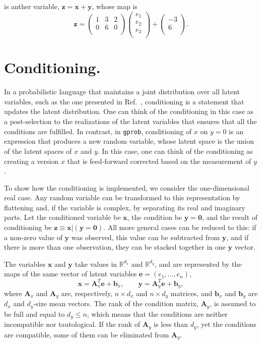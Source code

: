 \documentclass[a4paper,notitlepage]{article}
\renewcommand{\b}[1]{\mathbf{#1}}
\begin{document}
is anther variable, $\b{z}=\b{x}+\b{y}$, whose map is
\begin{equation}
\b{z}=
\begin{pmatrix}
1 & 3 & 2\\
0 & 6 & 0\\
\end{pmatrix}
\begin{pmatrix}
e_1\\
e_2\\
e_3\\
\end{pmatrix}
+
\begin{pmatrix}
-3\\
6\\
\end{pmatrix}.
\end{equation}


\section{Conditioning.}
\label{sec:conditioning}

In a probabilistic language that maintains a joint distribution over all latent variables, such as the one presented in Ref.~\cite{stein_compositional_2021}, conditioning is a statement that updates the latent distribution. One can think of the conditioning in this case as a post-selection to the realizations of the latent variables that ensures that all the conditions are fulfilled. In contrast, in \texttt{gprob}, conditioning of $x$ on $y=0$ is an expression that produces a new random variable, whose latent space is the union of the latent spaces of $x$ and $y$. 
In this case, one can think of the conditioning as creating a version $x$ that is feed-forward corrected based on the measurement of $y$.


To show how the conditioning is implemented, we consider the one-dimensional real case. Any random variable can be transformed to this representation by flattening and, if the variable is complex, by separating its real and imaginary parts. Let the conditioned variable be $\b{x}$, the condition be $\b{y}=\b{0}$, and the result of conditioning be $\b{z}\equiv\b{x}|(\b{y}=\b{0})$. All more general cases can be reduced to this: if a non-zero value of $\b{y}$ was observed, this value can be subtracted from $\b{y}$, and if there is more than one observation, they can be stacked together in one $\b{y}$ vector.

The variables $\b{x}$ and $\b{y}$ take values in $\mathbb{R}^{d_x}$ and $\mathbb{R}^{d_y}$, and are represented by the maps of the same vector of latent variables $\b{e}=(e_1,\ldots,e_n)$,
\begin{equation}
\b{x}=\b{A}_x^T\b{e} + \b{b}_x,\qquad
\b{y}=\b{A}_y^T\b{e} + \b{b}_y,
\end{equation}
where $\b{A}_x$ and $\b{A}_y$ are, respectively, $n\times d_x$ and $n\times d_y$ matrices, and $\b{b}_x$ and $\b{b}_y$ are $d_x$ and $d_y$-size mean vectors. The rank of the condition matrix, $\b{A}_y$, is assumed to be full and equal to $d_y\le n$, which means that the conditions are neither incompatible nor tautological. If the rank of $\b{A}_y$ is less than $d_y$, yet the conditions are compatible, some of them can be eliminated from $\b{A}_y$.
\end{document}
